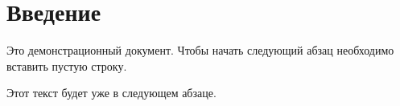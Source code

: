 \documentclass[russian,utf8,floatsection,equationsection]{eskdtext}
\begin{document}
\maketitle %
\tableofcontents %
\newpage %
\section{Введение} %
Это демонстрационный документ. Чтобы начать следующий абзац необходимо
вставить пустую строку.
 
Этот текст будет уже в следующем абзаце.
\end{document}
